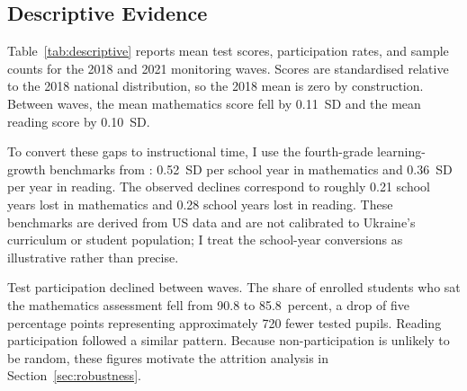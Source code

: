 
\subsection{Descriptive Evidence}
\label{subsec:descriptive}

Table~\ref{tab:descriptive} reports mean test scores, participation rates, and
sample counts for the 2018 and 2021 monitoring waves. Scores are standardised
relative to the 2018 national distribution, so the 2018 mean is zero by
construction. Between waves, the mean mathematics score fell by 0.11~SD and
the mean reading score by 0.10~SD.

To convert these gaps to instructional time, I use the fourth-grade
learning-growth benchmarks from \citet{hill2008empirical}: 0.52~SD per school
year in mathematics and 0.36~SD per year in reading. The observed declines
correspond to roughly 0.21 school years lost in mathematics and 0.28 school
years lost in reading. These benchmarks are derived from US data and are not
calibrated to Ukraine's curriculum or student population; I treat the
school-year conversions as illustrative rather than precise.

Test participation declined between waves. The share of enrolled students who
sat the mathematics assessment fell from 90.8 to 85.8~percent, a drop of
five percentage points representing approximately 720 fewer tested pupils.
Reading participation followed a similar pattern. Because non-participation
is unlikely to be random, these figures motivate the attrition analysis in
Section~\ref{sec:robustness}.


